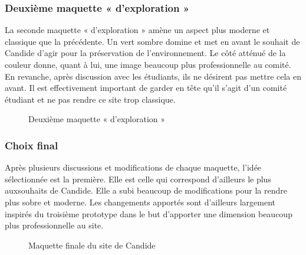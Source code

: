 \documentclass[a4,10pt,french]{sphinxmanual}
\begin{document}
\subsubsection{Deuxième maquette « d’exploration »}
\label{\detokenize{chapitre-06:deuxieme-maquette-dexploration}}
\sphinxAtStartPar
La seconde maquette « d’exploration » amène un aspect plus moderne et classique que la précédente. Un vert sombre domine et met en avant le souhait de Candide d’agir pour la préservation de l’environnement. Le côté atténué de la couleur donne, quant à lui, une image beaucoup plus professionnelle au comité.  En revanche, après discussion avec les étudiants, ils ne désirent pas mettre cela en avant. Il est effectivement important de garder en tête qu’il s’agit d’un comité étudiant et ne pas rendre ce site trop classique.

\begin{figure}[htbp]
\centering
\capstart

\noindent{}
\caption{Deuxième maquette « d’exploration »}\label{\detokenize{chapitre-06:id3}}\end{figure}


\subsubsection{Choix final}
\label{\detokenize{chapitre-06:choix-final}}
\sphinxAtStartPar
Après plusieurs discussions et modifications de chaque maquette, l’idée sélectionnée est la première. Elle est celle qui correspond d’ailleurs le plus auxsouhaits de Candide. Elle a subi beaucoup de modifications pour la rendre plus sobre et moderne. Les changements apportés sont d’ailleurs largement inspirés du troisième prototype dans le but d’apporter une dimension beaucoup plus professionnelle au site.

\begin{figure}[htbp]
\centering
\capstart

\noindent{}
\caption{Maquette finale du site de Candide}\label{\detokenize{chapitre-06:id4}}\end{figure}



\renewcommand{\indexname}{Index}
\printindex
\end{document}

